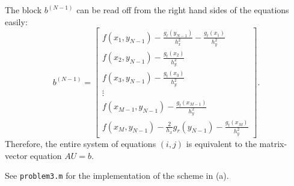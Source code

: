 \documentclass{homework}
\begin{document}
\begin{alphaparts}
\begin{equation*}
		\end{equation*}
		The block $b^{(N-1)}$ can be read off from the right hand sides of the equations easily:
		\begin{equation*}
			b^{(N-1)} = \left[\begin{matrix}
				f(x_1,y_{N-1}) - \frac{g_\ell(y_{N-1})}{h_x^2} - \frac{g_t(x_1)}{h_y^2} \\
				f(x_2,y_{N-1}) - \frac{g_t(x_2)}{h_y^2} \\
				f(x_3,y_{N-1}) - \frac{g_t(x_3)}{h_y^2} \\
				\vdots \\
				f(x_{M-1},y_{N-1}) - \frac{g_t(x_{M-1})}{h_y^2}\\
				f(x_{M},y_{N-1}) - \frac{2}{h_x}g_r(y_{N-1}) - \frac{g_t(x_{M})}{h_y^2}
			\end{matrix}\right].
		\end{equation*}
		Therefore, the entire system of equations $(i,j)$ is equivalent to the matrix-vector equation $AU = b$.
		
		\questionpart See \texttt{problem3.m} for the implementation of the scheme in (a).
	\end{alphaparts}
		
\end{document}
